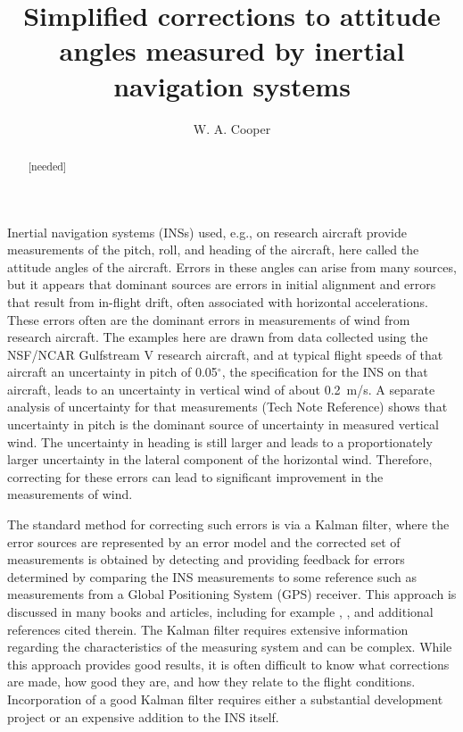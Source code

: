 \documentclass[english,british,amt,bookmarks=false,unicode=true]{copernicus}\usepackage[]{graphicx}\usepackage[]{color}
\begin{document}
\title{Simplified corrections to attitude angles measured by inertial navigation
systems}


\author{W. A. Cooper}








\maketitle
\begin{abstract}
{[}needed{]}
\end{abstract}

\introduction{}

Inertial navigation systems (INSs) used, e.g., on research aircraft
provide measurements of the pitch, roll, and heading of the aircraft,
here called the attitude angles of the aircraft. Errors in these angles
can arise from many sources, but it appears that dominant sources
are errors in initial alignment and errors that result from in-flight
drift, often associated with horizontal accelerations. These errors
often are the dominant errors in measurements of wind from research
aircraft. The examples here are drawn from data collected using the
NSF/NCAR Gulfstream V research aircraft, and at typical flight speeds
of that aircraft an uncertainty in pitch of 0.05$^{\circ}$, the specification
for the INS on that aircraft, leads to an uncertainty in vertical
wind of about 0.2~m/s. A separate analysis of uncertainty for that
measurements (Tech Note Reference) shows that uncertainty in pitch
is the dominant source of uncertainty in measured vertical wind. The
uncertainty in heading is still larger and leads to a proportionately
larger uncertainty in the lateral component of the horizontal wind.
Therefore, correcting for these errors can lead to significant improvement
in the measurements of wind.

The standard method for correcting such errors is via a Kalman filter,
where the error sources are represented by an error model and the
corrected set of measurements is obtained by detecting and providing
feedback for errors determined by comparing the INS measurements to
some reference such as measurements from a Global Positioning System
(GPS) receiver. This approach is discussed in many books and articles,
including for example \citet{noureldin2013fundamentals}, \citet{groves2013PrinciplesGNSS},
and additional references cited therein. The Kalman filter requires
extensive information regarding the characteristics of the measuring
system and can be complex. While this approach provides good results,
it is often difficult to know what corrections are made, how good
they are, and how they relate to the flight conditions. Incorporation
of a good Kalman filter requires either a substantial development
project or an expensive addition to the INS itself. 
\end{document}
